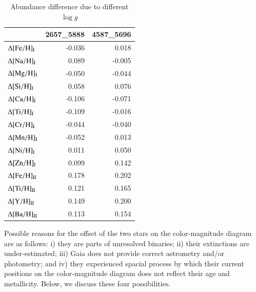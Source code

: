 \documentclass{aa}
\begin{document}
\begin{appendix}
\begin{table}
  \caption{Abundance difference due to different $\log g$ \label{tab:deltaA_IB}}
  \centering
  \begin{tabular}{lrr}
\hline\hline
                              & 2657\_5888 & 4587\_5696 \\ \hline
$\Delta [\mathrm{Fe/H}]_{\rm I }$ &  -0.036    & 0.018      \\  
$\Delta [\mathrm{Na/H}]_{\rm I }$ &  0.089     & -0.005     \\  
$\Delta [\mathrm{Mg/H}]_{\rm I }$ &  -0.050    & -0.044     \\  
$\Delta [\mathrm{Si/H}]_{\rm I }$ &  0.058     & 0.076      \\  
$\Delta [\mathrm{Ca/H}]_{\rm I }$ & -0.106     & -0.071     \\  
$\Delta [\mathrm{Ti/H}]_{\rm I }$ & -0.109     & -0.016     \\  
$\Delta [\mathrm{Cr/H}]_{\rm I }$ & -0.044     & -0.040     \\  
$\Delta [\mathrm{Mn/H}]_{\rm I }$ & -0.052     &  0.013     \\  
$\Delta [\mathrm{Ni/H}]_{\rm I }$ &  0.011     &  0.050     \\  
$\Delta [\mathrm{Zn/H}]_{\rm I }$ &  0.099     &  0.142     \\  
$\Delta [\mathrm{Fe/H}]_{\rm II}$ &  0.178     &  0.202     \\  
$\Delta [\mathrm{Ti/H}]_{\rm II}$ &  0.121     &  0.165     \\  
$\Delta [\mathrm{Y/H}]_{\rm II}$ &  0.149     &  0.200     \\  
$\Delta [\mathrm{Ba/H}]_{\rm II}$ &  0.113     &  0.154     \\ \hline 
  \end{tabular}
\end{table}


Possible reasons for the offset of the two stars on the color-magnitude diagram are as follows: i) they are parts of unresolved binaries; ii) their extinctions are under-estimated; iii) Gaia does not provide correct astrometry and/or photometry; and iv) they experienced spacial process by which their current positions on the color-magnitude diagram does not reflect their age and metallicity.
Below, we discuss these four possibilities.




\end{appendix}
\end{document}
